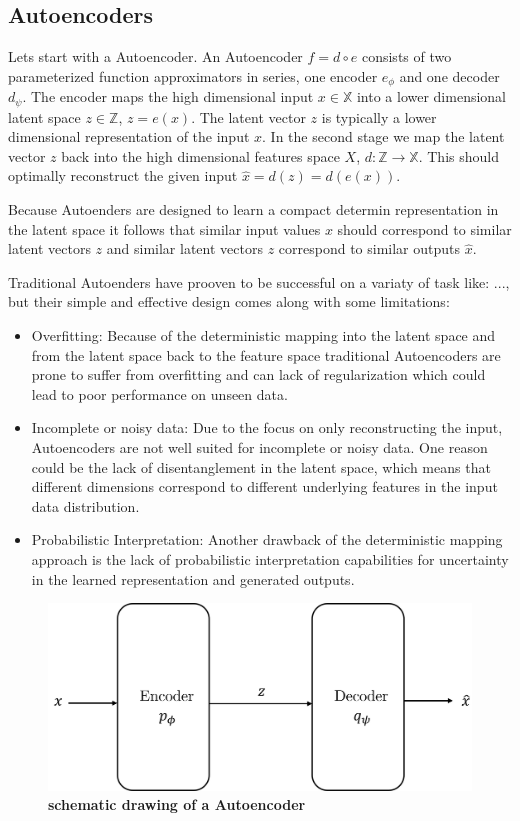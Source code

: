 \subsection{Autoencoders}


Lets start with a Autoencoder. An Autoencoder $f = d \circ e$ consists of two parameterized function approximators in series, one encoder $e_\phi$ and one decoder $d_\psi$. 
The encoder maps the high dimensional input $x \in \mathbb{X}$ into a lower dimensional latent space $z \in \mathbb{Z}$, $z = e(x)$.
The latent vector $z$ is typically a lower dimensional representation of the input $x$. 
In the second stage we map the latent vector $z$ back into the high dimensional features space $X$, $d: \mathbb{Z} \to \mathbb{X}$. This should optimally reconstruct the given input $\hat{x} = d(z) = d(e(x))$. 

Because Autoenders are designed to learn a compact determin representation in the latent space it follows that similar input values $x$ should correspond to similar latent vectors $z$ and similar latent vectors $z$ correspond to similar outputs $\hat{x}$.

Traditional Autoenders have prooven to be successful on a variaty of task like: ..., but their simple and effective design comes along with some limitations:
\begin{itemize}
	\item Overfitting: Because of the deterministic mapping into the latent space and from the latent space back to the feature space traditional Autoencoders are prone to suffer from overfitting and can lack of regularization which could lead to poor performance on unseen data.
	\item Incomplete or noisy data: Due to the focus on only reconstructing the input, Autoencoders are not well suited for incomplete or noisy data. One reason could be the lack of disentanglement in the latent space, which means that different dimensions correspond to different underlying features in the input data distribution. 
	\item Probabilistic Interpretation: Another drawback of the deterministic mapping approach is the lack of probabilistic interpretation capabilities for uncertainty in the learned representation and generated outputs.  
\end{itemize}
\begin{figure}
    \centering
    \includegraphics[width=0.5\linewidth]{figures/background/Autoencoder.png}
    \caption[Autoencoder schematics]{\textbf{schematic drawing of a Autoencoder}}
    \label{fig:Autoencoder_schematics}
\end{figure}

